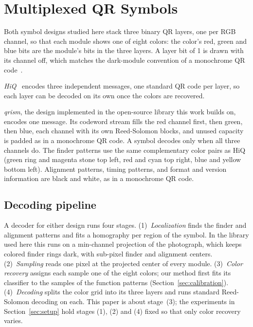 \section{Multiplexed QR Symbols}
\label{sec:symbol}

Both symbol designs studied here stack three binary QR layers, one per RGB channel, so
that each module shows one of eight colors: the color's red, green and blue bits are the
module's bits in the three layers. A layer bit of 1 is drawn with its channel off, which
matches the dark-module convention of a monochrome QR code~\cite{iso18004}.

\emph{HiQ}~\cite{yang2018hiq} encodes three independent messages, one standard QR code per
layer, so each layer can be decoded on its own once the colors are recovered.

\emph{qrism}, the design implemented in the open-source library this work builds on,
encodes one message. Its codeword stream fills the red channel first, then green, then
blue, each channel with its own Reed-Solomon blocks, and unused capacity is padded as in a
monochrome QR code. A symbol decodes only when all three channels do. The finder patterns use the same complementary color pairs as HiQ (green ring
and magenta stone top left, red and cyan top right, blue and yellow bottom left). Alignment
patterns, timing patterns, and format and version information are black and white, as in a
monochrome QR code.

\subsection{Decoding pipeline}

A decoder for either design runs four stages. (1)~\emph{Localization} finds the finder
and alignment patterns and fits a homography per region of the symbol. In the library used
here this runs on a min-channel projection of the photograph, which keeps colored finder
rings dark, with sub-pixel finder and alignment centers. (2)~\emph{Sampling} reads one pixel
at the projected center of every module. (3)~\emph{Color recovery} assigns each sample one
of the eight colors; our method first fits its classifier to the samples of the function
patterns (Section~\ref{sec:calibration}). (4)~\emph{Decoding} splits the color grid into its three layers and
runs standard Reed-Solomon decoding on each. This paper is about stage~(3); the experiments
in Section~\ref{sec:setup} hold stages (1), (2) and (4) fixed so that only color recovery
varies.
